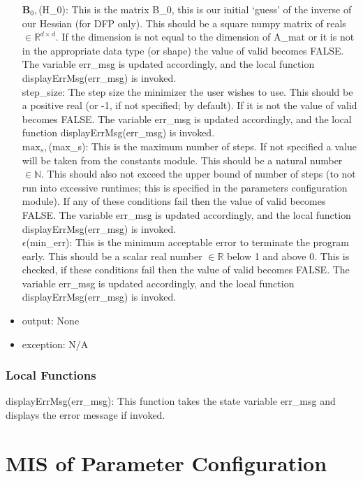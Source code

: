 \documentclass[12pt, titlepage]{article}
\begin{document}
\begin{itemize}
\noindent $\mathbf{B}_0,$(H\_0): This is the matrix B\_0, this is our initial `guess' of the inverse of our Hessian (for DFP only). This should be a square numpy matrix of reals $\in \mathbb{R}^{d \times d}$. If the dimension is not equal to the dimension of A\_mat or it is not in the appropriate data type (or shape) the value of valid becomes FALSE. The variable err\_msg is updated accordingly, and the local function displayErrMsg(err\_msg) is invoked.
\\

\noindent step\_size: The step size the minimizer the user wishes to use. This should be a positive real (or -1, if not specified; by default). If it is not the value of valid becomes FALSE. The variable err\_msg is updated accordingly, and the local function displayErrMsg(err\_msg) is invoked.
\\

\noindent $\text{max}_s,$(max\_s): This is the maximum number of steps. If not specified a value will be taken from the constants module. This should be a natural number $\in \mathbb{N}$. This should also not exceed the upper bound of number of steps (to not run into  excessive runtimes; this is specified in the parameters configuration module). If any of these conditions fail then the value of valid becomes FALSE. The variable err\_msg is updated accordingly, and the local function displayErrMsg(err\_msg) is invoked. 
\\

\noindent $\epsilon$(min\_err): This is the minimum acceptable error to terminate the program early. This should be a scalar real number $\in \mathbb{R}$ below 1 and above 0. This is checked, if these conditions fail then the value of valid becomes FALSE. The variable err\_msg is updated accordingly, and the local function displayErrMsg(err\_msg) is invoked.
\item output: None  
\item exception: N/A
\end{itemize}

\subsubsection{Local Functions}

displayErrMsg(err\_msg): This function takes the state variable err\_msg and displays the error message if invoked. 



\section{MIS of Parameter Configuration}\label{Module:ParamConfig}
\end{document}
